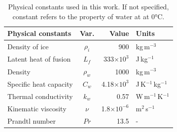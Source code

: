 \begin{table}[H]
\centering
\caption{Physical constants used in this work.  If not specified, constant refers to the property of water at at 0°C.}
\begin{tabular}{l c r l}
\hline
\textbf{Physical constants} & \textbf{Var.} & \textbf{Value} & \textbf{Units}\\
\hline
Density of ice &  $\rho_i$ & 900& kg\,m$^{-3}$ \\
Latent heat of fusion & $L_f$ & 333$\times10^3$ & J\,kg$^{-1}$\\
Density &  $\rho_w$ & 1000 & kg\,m$^{-3}$ \\
Specific heat capacity & $C_w$ & 4.18$\times10^3$ & J\,K$^{-1}$\,kg$^{-1}$\\
Thermal conductivity & $k_w$ & 0.57 & W\,m$^{-1}$\,K$^{-1}$\\
Kinematic viscosity  & $\nu$ & 1.8$\times10^{-6}$ & m$^2$\,s$^{-1}$\\
Prandtl number & $Pr$ & 13.5 & -\\

\hline
\end{tabular}
\label{table physical constants}
\end{table}


